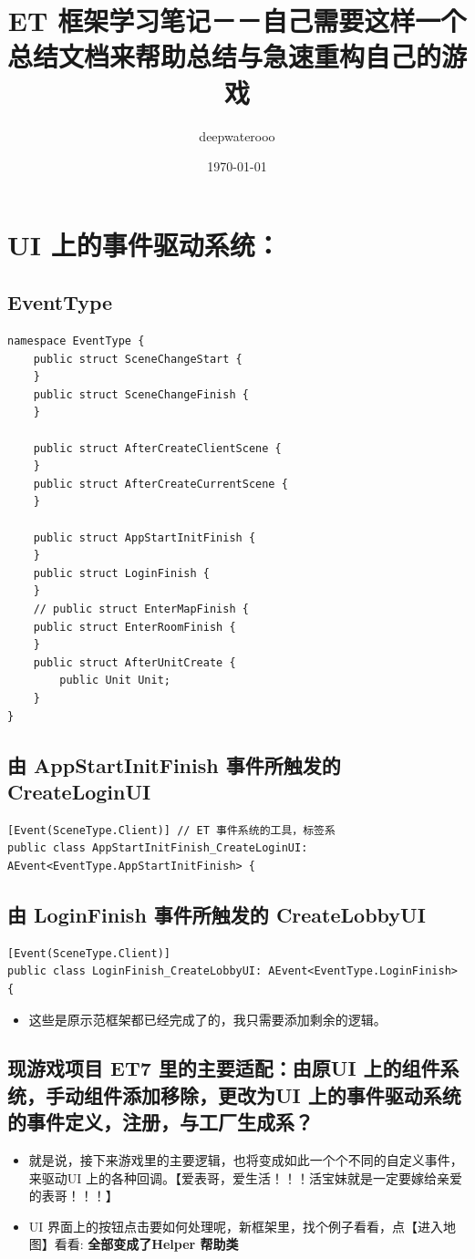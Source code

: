 \documentclass[9pt, b5paper]{article}
\author{deepwaterooo}
\date{\today}
\title{ET 框架学习笔记－－自己需要这样一个总结文档来帮助总结与急速重构自己的游戏}
\begin{document}
\maketitle
\tableofcontents


\section{UI 上的事件驱动系统：}
\label{sec:orgc536f4f}
\subsection{EventType}
\label{sec:orgb952841}
\begin{verbatim}
namespace EventType {
    public struct SceneChangeStart {
    }
    public struct SceneChangeFinish {
    }

    public struct AfterCreateClientScene {
    }
    public struct AfterCreateCurrentScene {
    }

    public struct AppStartInitFinish {
    }
    public struct LoginFinish {
    }
    // public struct EnterMapFinish {
    public struct EnterRoomFinish {
    }
    public struct AfterUnitCreate {
        public Unit Unit;
    }
}
\end{verbatim}
\subsection{由 AppStartInitFinish 事件所触发的 CreateLoginUI}
\label{sec:org63a641d}
\begin{verbatim}
[Event(SceneType.Client)] // ET 事件系统的工具，标签系
public class AppStartInitFinish_CreateLoginUI: AEvent<EventType.AppStartInitFinish> {
\end{verbatim}
\subsection{由 LoginFinish 事件所触发的 CreateLobbyUI}
\label{sec:org23dcdd2}
\begin{verbatim}
[Event(SceneType.Client)]
public class LoginFinish_CreateLobbyUI: AEvent<EventType.LoginFinish> {
\end{verbatim}
\begin{itemize}
\item 这些是原示范框架都已经完成了的，我只需要添加剩余的逻辑。
\end{itemize}
\subsection{现游戏项目 ET7 里的主要适配：由原UI 上的组件系统，手动组件添加移除，更改为UI 上的事件驱动系统的事件定义，注册，与工厂生成系？}
\label{sec:orga0910d2}
\begin{itemize}
\item 就是说，接下来游戏里的主要逻辑，也将变成如此一个个不同的自定义事件，来驱动UI 上的各种回调。【爱表哥，爱生活！！！活宝妹就是一定要嫁给亲爱的表哥！！！】
\item UI 界面上的按钮点击要如何处理呢，新框架里，找个例子看看，点【进入地图】看看: \textbf{全部变成了Helper 帮助类}
\end{itemize}
\end{document}
